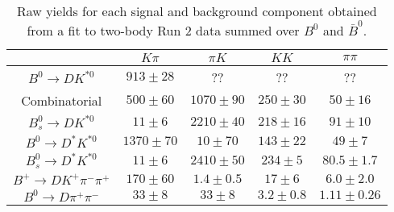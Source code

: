 \begin{table}
  \centering
  \begin{tabular}{ccccc}
      \toprule
       & $K\pi$ & $\pi K$ & $KK$ & $\pi\pi$ \\
      \midrule
      $B^0 \to DK^{*0}$ & $913 \pm 28$ & ?? & ?? & ?? \\
      Combinatorial & $500 \pm 60$ & $1070 \pm 90$ & $250 \pm 30$ & $50 \pm 16$ \\
      $B^0_s \to DK^{*0}$ & $11 \pm 6$ & $2210 \pm 40$ & $218 \pm 16$ & $91 \pm 10$ \\
      $B^0 \to D^*K^{*0}$ & $1370 \pm 70$ & $10 \pm 70$ & $143 \pm 22$ & $49 \pm 7$ \\
      $B^0_s \to D^*K^{*0}$ & $11 \pm 6$ & $2410 \pm 50$ & $234 \pm 5$ & $80.5 \pm 1.7$ \\
      $B^+ \to DK^+\pi^-\pi^+$ & $170 \pm 60$ & $1.4 \pm 0.5$ & $17 \pm 6$ & $6.0 \pm 2.0$ \\
      $B^0 \to D\pi^+\pi^-$ & $33 \pm 8$ & $33 \pm 8$ & $3.2 \pm 0.8$ & $1.11 \pm 0.26$ \\
      \bottomrule
      \end{tabular}
  \caption{Raw yields for each signal and background component obtained from a fit to two-body Run 2 data summed over $B^0$ and $\bar{B}^0$.}
\label{tab:yields_combined_2body_run2}
\end{table}
